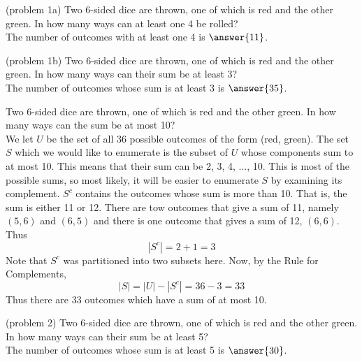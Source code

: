 \documentclass[handout]{ximera}
\begin{document}
\begin{problem}(problem 1a)
Two 6-sided dice are thrown, one of which is red and the other green.  
In how many ways can at least one 4 be rolled?\\
The number of outcomes with at least one 4 is $\answer{11}$.
\end{problem}

\begin{problem}(problem 1b)
Two 6-sided dice are thrown, one of which is red and the other green.  
In how many ways can their sum be at least 3?\\
The number of outcomes whose sum is at least 3 is $\answer{35}$.
\end{problem}


\begin{example}[example 2]
Two 6-sided dice are thrown, one of which is red and the other green.  
In how many ways can the sum be at most 10?\\
We let $U$ be the set of all 36 possible outcomes of the form (red, green).
The set $S$ which we would like to enumerate is the subset of $U$ whose components sum to at most 10. This means that their sum can be 2, 3, 4, ..., 10. This is most of the possible sums, so most likely, it will be easier to enumerate $S$ by examining its complement.
$S^c$ contains the outcomes whose sum is more than 10. That is, the sum is either 11 or 12. There are tow outcomes that give a sum of 11, namely $(5,6)$ and $(6,5)$ and there is one outcome that gives a sum of 12, $(6,6)$. Thus
\[
|S^c| = 2 + 1 = 3
\]
Note that $S^c$ was partitioned into two subsets here.
Now, by the Rule for Complements,
\[
|S| = |U| - |S^c| = 36 -3 = 33
\]
Thus there are 33 outcomes which have a sum of at most 10.
\end{example}


\begin{problem}(problem 2)
Two 6-sided dice are thrown, one of which is red and the other green.  
In how many ways can their sum be at least 5?\\
The number of outcomes whose sum is at least 5 is $\answer{30}$.
\end{problem}
\end{document}
